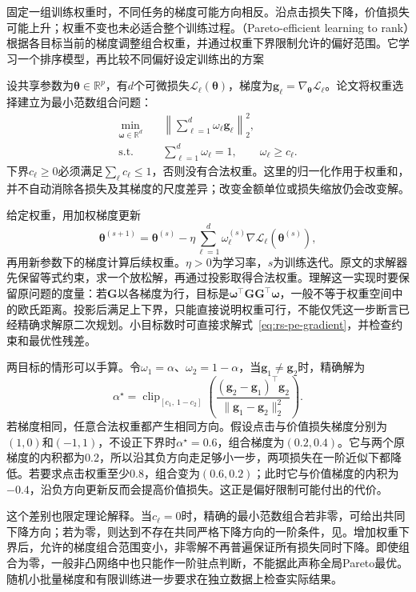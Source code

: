 固定一组训练权重时，不同任务的梯度可能方向相反。沿点击损失下降，价值损失可能上升；权重不变也未必适合整个训练过程。（Pareto-efficient learning to rank）根据各目标当前的梯度调整组合权重，并通过权重下界限制允许的偏好范围。它学习一个排序模型，再比较不同偏好设定训练出的方案

设共享参数为$\bm{\theta}\in\mathbb{R}^{p}$，有$d$个可微损失$\mathcal{L}_\ell(\bm{\theta})$，梯度为$\bm{g}_\ell=\nabla_{\bm{\theta}}\mathcal{L}_\ell$。论文将权重选择建立为最小范数组合问题：
\begin{equation}
 \begin{aligned}
  \min_{\bm{\omega}\in\mathbb{R}^{d}}\quad&
   \left\lVert\sum_{\ell=1}^{d}\omega_\ell\bm{g}_\ell
   \right\rVert_2^2,\\
  \text{s.t.}\quad&
   \sum_{\ell=1}^{d}\omega_\ell=1,\qquad
   \omega_\ell\geq c_\ell.
 \end{aligned}
 \label{eq:rs-pe-gradient}
\end{equation}
下界$c_\ell\geq0$必须满足$\sum_\ell c_\ell\leq1$，否则没有合法权重。这里的归一化作用于权重和，并不自动消除各损失及其梯度的尺度差异；改变金额单位或损失缩放仍会改变解。

给定权重，用加权梯度更新
\[
 \bm{\theta}^{(s+1)}
 =\bm{\theta}^{(s)}
  -\eta\sum_{\ell=1}^{d}\omega_\ell^{(s)}
       \nabla\mathcal{L}_\ell(\bm{\theta}^{(s)}),
\]
再用新参数下的梯度计算后续权重。$\eta>0$为学习率，$s$为训练迭代。原文的求解器先保留等式约束，求一个放松解，再通过投影取得合法权重。理解这一实现时要保留原问题的度量：若$\bm{G}$以各梯度为行，目标是$\bm{\omega}^{\top}\bm{G}\bm{G}^{\top}\bm{\omega}$，一般不等于权重空间中的欧氏距离。投影后满足上下界，只能直接说明权重可行，不能仅凭这一步断言已经精确求解原二次规划。小目标数时可直接求解式~\eqref{eq:rs-pe-gradient}，并检查约束和最优性残差。

两目标的情形可以手算。令$\omega_1=\alpha$、$\omega_2=1-\alpha$，当$\bm{g}_1\ne\bm{g}_2$时，精确解为
\[
 \alpha^\star=
 \operatorname{clip}_{[c_1,\,1-c_2]}
 \left(
 \frac{(\bm{g}_2-\bm{g}_1)^\top\bm{g}_2}
      {\lVert\bm{g}_1-\bm{g}_2\rVert_2^2}
 \right).
\]
若梯度相同，任意合法权重都产生相同方向。假设点击与价值损失梯度分别为$(1,0)$和$(-1,1)$，不设正下界时$\alpha^\star=0.6$，组合梯度为$(0.2,0.4)$。它与两个原梯度的内积都为0.2，所以沿其负方向走足够小一步，两项损失在一阶近似下都降低。若要求点击权重至少0.8，组合变为$(0.6,0.2)$；此时它与价值梯度的内积为$-0.4$，沿负方向更新反而会提高价值损失。这正是偏好限制可能付出的代价。

这个差别也限定理论解释。当$c_\ell=0$时，精确的最小范数组合若非零，可给出共同下降方向；若为零，则达到不存在共同严格下降方向的一阶条件，见。增加权重下界后，允许的梯度组合范围变小，非零解不再普遍保证所有损失同时下降。即使组合为零，一般非凸网络中也只能作一阶驻点判断，不能据此声称全局Pareto最优。随机小批量梯度和有限训练进一步要求在独立数据上检查实际结果。

